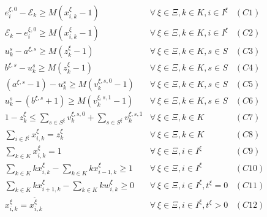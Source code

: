 \documentclass[]{interact}
\theoremstyle{plain}%
\theoremstyle{definition}
\theoremstyle{remark}
\begin{document}
\begin{eqnarray}
e^{\xi,0}_i-\mathcal{E}_{k} \ge M(x^{\xi}_{i,k}-1)& \forall\ \xi\in \Xi,k\in K,i\in I^{\xi}&(C1)\nonumber\\
\mathcal{E}_{k} -e^{\xi,0}_i\ge M(x^{\xi}_{i,k}-1)&\forall\ \xi\in \Xi,k\in K,i\in I^{\xi}&(C2)\nonumber\\
u^s_k - a^{\xi,s} \ge M(z^{\xi}_{k}-1)&\forall\ \xi\in \Xi,k\in K,s\in S&(C3)\nonumber\\
b^{\xi,s} - u^s_k \ge M(z^{\xi}_{k}-1)&\forall\ \xi\in \Xi,k\in K,s\in S&(C4)\nonumber\\
( a^{\xi,s}-1) - u^s_k \ge M(v^{\xi,s,0}_k-1) & \forall\ \xi\in \Xi,k\in K,s\in S &(C5)\nonumber\\
u^s_k -  (b^{\xi,s}+1) \ge M(v^{\xi,s,1}_k-1) & \forall\ \xi\in \Xi,k\in K,s\in S &(C6)\nonumber\\
1 - z^{\xi}_{k} \le \sum_{s\in S^{\xi}} v^{\xi,s,0}_k + \sum_{s\in S^{\xi}} v^{\xi,s,1}_k&\forall\ \xi\in \Xi,k\in K&(C7)\nonumber\\
\sum_{i\in I^{\xi}} x^{\xi}_{i,k} = z^{\xi}_k&\forall\ \xi\in \Xi,k\in K&(C8)\nonumber\\
\sum_{k\in K} x^{\xi}_{i,k} =1& \forall\ \xi\in \Xi,i\in I^{\xi}&(C9)\nonumber\\
\sum_{k\in K} kx^{\xi}_{i,k} - \sum_{k\in K} kx^{\xi}_{i-1,k} \ge 1&  \forall\ \xi\in \Xi,i\in I^{\xi}&(C10)\nonumber\\
\sum_{k\in K} kx^{\xi}_{i+1,k} - \sum_{k\in K} kw^{\xi}_{i,k} \ge 0&  \forall\ \xi\in \Xi,i\in I^{\xi}, t^{\xi} = 0&(C11)\nonumber\\
x^{\xi}_{i,k} = x^{\tilde{\xi}}_{i,k}&  \forall\ \xi\in \Xi,i\in I^{\xi}, t^{\xi} > 0&(C12)\nonumber
\end{eqnarray}
\end{document}
